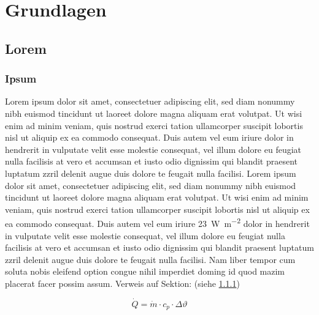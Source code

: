 \chapter{Grundlagen}
\label{cha:Blabla}

\section{Lorem}
\label{sec:Sektion 1}

\subsection{Ipsum}
\label{subsec:Abschnitt1}
Lorem ipsum dolor sit amet, consectetuer adipiscing elit, sed diam nonummy nibh euismod tincidunt ut laoreet dolore 
magna aliquam erat volutpat. Ut wisi enim ad minim veniam, quis nostrud exerci tation ullamcorper suscipit lobortis nisl 
ut aliquip ex ea commodo consequat. Duis autem vel eum iriure dolor in hendrerit in vulputate velit esse molestie 
consequat, vel illum dolore eu feugiat nulla facilisis at vero et accumsan et iusto odio dignissim qui blandit praesent 
luptatum zzril delenit augue duis dolore te feugait nulla facilisi. Lorem ipsum dolor sit amet, consectetuer adipiscing 
elit, sed diam nonummy nibh euismod tincidunt ut laoreet dolore magna aliquam erat volutpat. Ut wisi enim ad minim 
veniam, quis nostrud exerci tation ullamcorper suscipit lobortis nisl ut aliquip ex ea commodo consequat. Duis autem vel 
eum iriure \SI{23}{\watt\per\m^{2}} dolor in hendrerit in vulputate velit esse molestie consequat, vel illum dolore eu 
feugiat nulla facilisis at vero et accumsan et iusto odio dignissim qui blandit praesent luptatum zzril delenit augue 
duis dolore te feugait nulla facilisi. Nam liber tempor cum soluta nobis eleifend option congue nihil imperdiet doming 
id quod mazim placerat facer possim assum.
Verweis auf Sektion: (siehe \ref{subsec:Abschnitt1})

\begin{equation}
\dot{Q}=\dot{m}\cdot c_p \cdot \Delta \vartheta
\end{equation}

